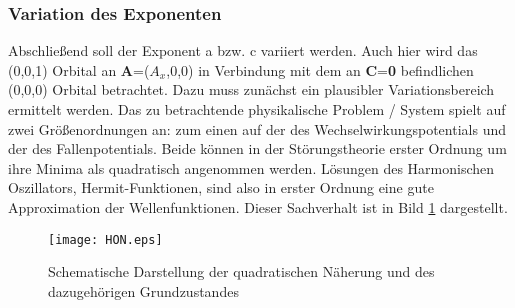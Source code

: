 \subsubsection{Variation des Exponenten}
%
Abschließend soll der Exponent a bzw. c variiert 
werden. Auch hier wird das (0,0,1) Orbital an 
\textbf{A}=($A_x$,0,0) in Verbindung mit dem an 
\textbf{C}=\textbf{0} 
befindlichen (0,0,0) Orbital betrachtet. Dazu muss 
zunächst ein plausibler Variationsbereich ermittelt 
werden. Das zu betrachtende physikalische Problem / 
System spielt auf zwei Größenordnungen an: zum einen auf 
der des Wechselwirkungspotentials und der des 
Fallenpotentials. Beide können in der Störungstheorie 
erster Ordnung um ihre Minima als quadratisch 
angenommen werden. Lösungen des Harmonischen Oszillators, 
Hermit-Funktionen, sind also in erster Ordnung eine 
gute Approximation der Wellenfunktionen. Dieser Sachverhalt ist in Bild 
\ref{pic:quad.naerung} dargestellt.
%
\begin{figure}[t] \centering
	\texttt{[image: HON.eps]}
	\vspace*{-10mm}
	\caption{Schematische Darstellung der quadratischen Näherung und des 
	dazugehörigen Grundzustandes}
	\label{pic:quad.naerung} 
\end{figure}
%

